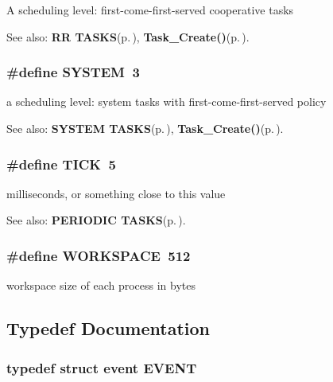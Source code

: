 A scheduling level: first-come-first-served cooperative tasks \begin{Desc}
\item[See also:]{\bf RR TASKS}{\rm (p.\,\pageref{index_rr})}, {\bf Task\_\-Create()}{\rm (p.\,\pageref{os_8c_d26f7e7c3185a703e89e97547747b03e})}. \end{Desc}
\subsubsection{\setlength{\rightskip}{0pt plus 5cm}\#define SYSTEM~3}\label{os_8h_21b97df85e65556468b28a576311271c}


a scheduling level: system tasks with first-come-first-served policy \begin{Desc}
\item[See also:]{\bf SYSTEM TASKS}{\rm (p.\,\pageref{index_system})}, {\bf Task\_\-Create()}{\rm (p.\,\pageref{os_8c_d26f7e7c3185a703e89e97547747b03e})}. \end{Desc}
\subsubsection{\setlength{\rightskip}{0pt plus 5cm}\#define TICK~5}\label{os_8h_7d5ee1cc1e801872efa1ea7486189019}


milliseconds, or something close to this value \begin{Desc}
\item[See also:]{\bf PERIODIC TASKS}{\rm (p.\,\pageref{index_periodic})}. \end{Desc}
\subsubsection{\setlength{\rightskip}{0pt plus 5cm}\#define WORKSPACE~512}\label{os_8h_420f71a6e3a201757631a92a1fb38529}


workspace size of each process in bytes 

\subsection{Typedef Documentation}
\subsubsection{\setlength{\rightskip}{0pt plus 5cm}typedef struct event {\bf EVENT}}\label{os_8h_a280985b6f47e1541bbf5012bf62c450}



